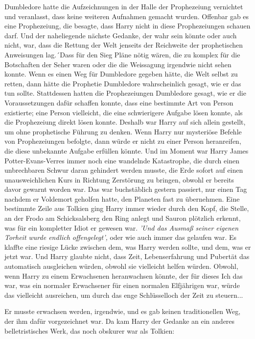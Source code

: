Dumbledore hatte die Aufzeichnungen in der Halle der Prophezeiung vernichtet und
veranlasst, dass keine weiteren Aufnahmen gemacht wurden. Offenbar gab es eine
Prophezeiung, die besagte, dass Harry nicht in diese Prophezeiungen schauen
darf. Und der naheliegende nächste Gedanke, der wahr sein könnte oder auch
nicht, war, dass die Rettung der Welt jenseits der Reichweite der prophetischen
Anweisungen lag.´Dass für den Sieg Pläne nötig wären, die zu komplex für die
Botschaften der Seher waren oder die die Weissagung irgendwie nicht sehen
konnte. Wenn es einen Weg für Dumbledore gegeben hätte, die Welt selbst zu
retten, dann hätte die Prophetie Dumbledore wahrscheinlich gesagt, wie er das
tun sollte. Stattdessen hatten die Prophezeiungen Dumbledore gesagt, wie er die
Voraussetzungen dafür schaffen konnte, dass eine bestimmte Art von Person
existierte; eine Person vielleicht, die eine schwierigere Aufgabe lösen konnte,
als die Prophezeiung direkt lösen konnte. Deshalb war Harry auf sich allein
gestellt, um ohne prophetische Führung zu denken. Wenn Harry nur mysteriöse
Befehle von Prophezeiungen befolgte, dann würde er nicht zu einer Person
heranreifen, die diese unbekannte Aufgabe erfüllen könnte. Und im Moment war
Harry James Potter-Evans-Verres immer noch eine wandelnde Katastrophe, die durch
einen unbrechbaren Schwur daran gehindert werden musste, die Erde sofort auf
einen unausweichlichen Kurs in Richtung Zerstörung zu bringen, obwohl er bereits
davor gewarnt worden war. Das war buchstäblich gestern passiert, nur einen Tag
nachdem er Voldemort geholfen hatte, den Planeten fast zu übernehmen. Eine
bestimmte Zeile aus Tolkien ging Harry immer wieder durch den Kopf, die Stelle,
an der Frodo am Schicksalsberg den Ring anlegt und Sauron plötzlich erkennt, was
für ein kompletter Idiot er gewesen war.
\emph{'Und das Ausmaß seiner eigenen Torheit wurde endlich offengelegt', }
oder wie auch immer das gelaufen war. Es klaffte eine riesige Lücke zwischen
dem, was Harry werden sollte, und dem, was er jetzt war. Und Harry glaubte
nicht, dass Zeit, Lebenserfahrung und Pubertät das automatisch ausgleichen
würden, obwohl sie vielleicht helfen würden. Obwohl, wenn Harry zu einem
Erwachsenen heranwachsen könnte, der für dieses Ich das war, was ein normaler
Erwachsener für einen normalen Elfjährigen war, würde das vielleicht ausreichen,
um durch das enge Schlüsselloch der Zeit zu steuern...

Er musste erwachsen werden, irgendwie, und es gab keinen traditionellen Weg, der
ihm dafür vorgezeichnet war. Da kam Harry der Gedanke an ein anderes
belletristisches Werk, das noch obskurer war als Tolkien:

